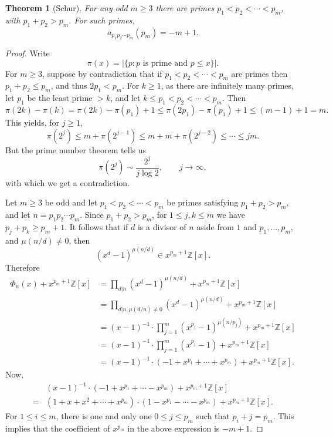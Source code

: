 \documentclass{article}
\newtheorem{theorem}{Theorem}
\theoremstyle{definition}
\begin{document}
\begin{theorem}[Schur]
For any odd $m \geq 3$ there are primes $p_1<p_2<\cdots<p_m$, with $p_1+p_2>p_m$.
For such primes,
\[
a_{p_1p_2\cdots p_m}(p_m) = -m+1.
\]
\end{theorem}
\begin{proof}
Write
\[
\pi(x) = |\{p: \textrm{$p$ is prime and $p \leq x$}\}|.
\]
For  $m \geq 3$, suppose by contradiction that if
$p_1<p_2<\cdots<p_m$ are primes then $p_1+p_2 \leq p_m$, and thus
$2p_1<p_m$.
For $k \geq 1$, 
as there are infinitely many primes, let $p_1$ be the least prime $> k$, and let
$k \leq p_1<p_2<\cdots<p_m$. 
Then
\[
\pi(2k)-\pi(k) = \pi(2k) - \pi(p_1) +1 \leq \pi(2p_1) - \pi(p_1) + 1
\leq (m-1)+1 = m.
\]
This yields, for $j \geq 1$,
\[
\pi(2^j) \leq m+\pi(2^{j-1}) \leq m+m+\pi(2^{j-2}) \leq 
\cdots \leq jm.
\]
But the prime number theorem tells us 
\[
\pi(2^j) \sim \frac{2^j}{j \log 2},\qquad j \to \infty,
\]
with which we get a contradiction. 

Let $m \geq 3$ be odd and let $p_1<p_2<\cdots<p_m$ be primes satisfying $p_1+p_2>p_m$,
and let $n=p_1  p_2 \cdots p_m$. Since $p_1+p_2>p_m$, for $1 \leq j,k \leq m$ we have $p_j+p_k \geq p_m+1$. 
It follows that if $d$ is a divisor of $n$ aside from $1$ and $p_1,\ldots,p_m$, and $\mu(n/d) \neq 0$, then
\[
(x^d-1)^{\mu(n/d)} \in x^{p_m+1} \mathbb{Z}[x].
\]
Therefore
\begin{align*}
\Phi_n(x)+x^{p_m+1} \mathbb{Z}[x]&=\prod_{d|n} (x^d-1)^{\mu(n/d)}+x^{p_m+1} \mathbb{Z}[x]\\
&=\prod_{d|n, \mu(d/n) \neq 0} (x^d-1)^{\mu(n/d)}+x^{p_m+1} \mathbb{Z}[x]\\
&=(x-1)^{-1} \cdot \prod_{j=1}^m (x^{p_j}-1)^{\mu(n/p_j)}+x^{p_m+1} \mathbb{Z}[x]\\
&=(x-1)^{-1} \cdot  \prod_{j=1}^m (x^{p_j}-1) +x^{p_m+1} \mathbb{Z}[x]\\
&=(x-1)^{-1} \cdot (-1+x^{p_1}+\cdots+x^{p_m}) +x^{p_m+1} \mathbb{Z}[x].
\end{align*}
Now,
\[
\begin{split}
&(x-1)^{-1} \cdot (-1+x^{p_1}+\cdots-x^{p_m}) +x^{p_m+1} \mathbb{Z}[x]\\
=&(1+x+x^2+\cdots+x^{p_m}) \cdot (1-x^{p_1}-\cdots-x^{p_m}) +x^{p_m+1} \mathbb{Z}[x].
\end{split}
\]
For $1 \leq i \leq m$, 
there is one and only one
$0 \leq j \leq p_m$ such that 
$p_i+j=p_m$. This implies that the coefficient of $x^{p_m}$ in the above expression is
$-m+1$. 
\end{proof}
\end{document}
